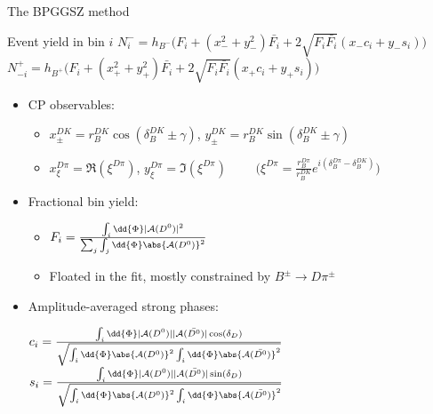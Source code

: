 \documentclass[xcolor={dvipsnames}]{beamer}
\begin{document}
\begin{frame}{The BPGGSZ method}
\begin{center}
    \begin{minipage}{0.6\textwidth}
      \begin{block}{Event yield in bin $i$}
        \footnotesize
        $N^-_i = h_{B^-}\big(F_i + (x_-^2 + y_-^2)\bar{F_i} + 2\sqrt{F_i\bar{F_i}}(x_-c_i + y_-s_i)\big)$ \\
        $N^+_{-i} = h_{B^+}\big(F_i + (x_+^2 + y_+^2)\bar{F_i} + 2\sqrt{F_i\bar{F_i}}(x_+c_i + y_+s_i)\big)$
      \end{block}
    \end{minipage}
  \end{center}
  \begin{itemize}
    \item{CP observables:}
    \begin{itemize}
      \item{$x_\pm^{DK} = r_B^{DK}\cos(\delta_B^{DK}\pm\gamma)$, \quad $y_\pm^{DK} = r_B^{DK}\sin(\delta_B^{DK}\pm\gamma)$}
      \item{$x_\xi^{D\pi} = \Re(\xi^{D\pi})$, $y_\xi^{D\pi} = \Im(\xi^{D\pi})$ $\quad\quad\Big(\xi^{D\pi} = \frac{r_B^{D\pi}}{r_B^{DK}}e^{i(\delta_B^{D\pi} - \delta_B^{DK})}\Big)$}
    \end{itemize}
    \item{Fractional bin yield:}
    \begin{itemize}
      \item{$F_i = \frac{\int_i\dd{\Phi}|\mathcal{A}(D^0)|^2}{\sum_j\int_j\dd{\Phi}\abs{\mathcal{A}(D^0)}^2}$}
      \item{Floated in the fit, mostly constrained by $B^\pm\to D\pi^\pm$}
    \end{itemize}
  \end{itemize}
  \begin{itemize}
    \item{Amplitude-averaged strong phases:}
    \begin{center}
      $c_i = \frac{\int_i\dd{\Phi}|\mathcal{A}(D^0)||\mathcal{A}(\bar{D^0})|\cos(\delta_D)}{\sqrt{\int_i\dd{\Phi}\abs{\mathcal{A}(D^0)}^2\int_i\dd{\Phi}\abs{\mathcal{A}(\bar{D^0})}^2}}$ \quad $s_i = \frac{\int_i\dd{\Phi}|\mathcal{A}(D^0)||\mathcal{A}(\bar{D^0})|\sin(\delta_D)}{\sqrt{\int_i\dd{\Phi}\abs{\mathcal{A}(D^0)}^2\int_i\dd{\Phi}\abs{\mathcal{A}(\bar{D^0})}^2}}$
    \end{center}
  \end{itemize}
\end{frame}
\end{document}
